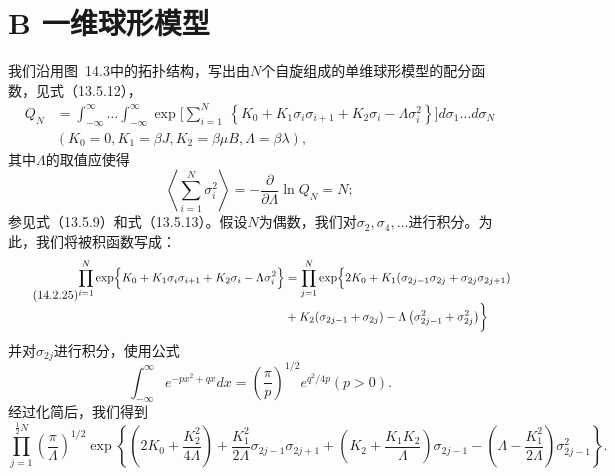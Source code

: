 \section{B 一维球形模型}\label{b-ux4e00ux7ef4ux7403ux5f62ux6a21ux578b}
我们沿用图~14.3中的拓扑结构，写出由\(N\)个自旋组成的单维球形模型的配分函数，见式（13.5.12），
\begin{equation}\tag{14.2.23}\label{eq:14.2.23}
\begin{aligned}Q_{N}&=\int_{-\infty}^{\infty}\ldots\int_{-\infty}^{\infty}\exp\biggl[\sum_{i=1}^{N}\:\left\{K_{0}+K_{1}\sigma_{i}\sigma_{i+1}+K_{2}\sigma_{i}-\Lambda\sigma_{i}^{2}\right\}\biggr]d\sigma_{1}\ldots d\sigma_{N}\\&(K_{0}=0,K_{1}=\beta J,K_{2}=\beta\mu B,\Lambda=\beta\lambda),\end{aligned}
\end{equation}
其中\(\Lambda\)的取值应使得
\begin{equation}\tag{14.2.24}\label{eq:14.2.24}
\left\langle \sum _ { i = 1 } ^{N} \sigma _ { i } ^{2} \right\rangle = - \frac { \partial } { \partial \Lambda } \ln Q _ { N } = N ;
\end{equation}
参见式（13.5.9）和式（13.5.13）。假设\(N\)为偶数，我们对\(\sigma_2, \sigma_4, \ldots\)进行积分。为此，我们将被积函数写成：
\begin{equation}\tag{14.2.25}\label{eq:14.2.25}
\begin{aligned}\prod_{i=1}^N\exp\Bigl\{K_0+K_1\sigma_i\sigma_{i+1}+K_2\sigma_i-\Lambda\sigma_i^2\Bigr\}&=\prod_{j=1}^N\exp\Bigl\{2K_0+K_1(\sigma_{2j-1}\sigma_{2j}+\sigma_{2j}\sigma_{2j+1})\\&+K_2(\sigma_{2j-1}+\sigma_{2j})-\Lambda\left(\sigma_{2j-1}^2+\sigma_{2j}^2\right)\biggr\}\end{aligned}
\end{equation}
并对\(\sigma_{2j}\)进行积分，使用公式
\begin{equation}\tag{14.2.26}\label{eq:14.2.26}
\int _ { - \infty } ^{\infty} e ^{- p x ^ { 2} + q x } d x = \left( { \frac { \pi } { p } } \right) ^{1 / 2} e ^{q ^ { 2} / 4 p }  ( p > 0 ) .
\end{equation}
经过化简后，我们得到
\begin{equation}\tag{14.2.27}\label{eq:14.2.27}
\prod _ { j = 1 } ^{\frac { 1} { 2 } N } \left( \frac { \pi } { \Lambda } \right) ^{1 / 2} \exp \left\{ \left( 2 K _ { 0 } + \frac { K _ { 2 } ^{2} } { 4 \Lambda } \right) + \frac { K _ { 1 } ^{2} } { 2 \Lambda } \sigma _ { 2 j - 1 } \sigma _ { 2 j + 1 } + \left( K _ { 2 } + \frac { K _ { 1 } K _ { 2 } } { \Lambda } \right) \sigma _ { 2 j - 1 } - \left( \Lambda - \frac { K _ { 1 } ^{2} } { 2 \Lambda } \right) \sigma _ { 2 j - 1 } ^{2} \right\} .
\end{equation}
